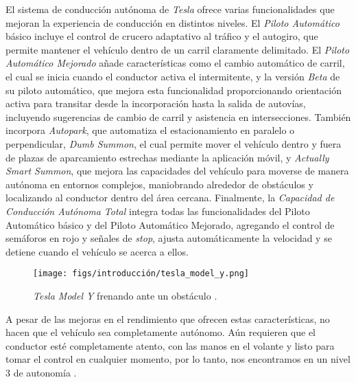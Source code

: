 El sistema de conducción autónoma de \textit{Tesla} ofrece varias funcionalidades que mejoran la experiencia de conducción en distintos niveles. El \textit{Piloto Automático} básico incluye el control de crucero adaptativo al tráfico y el autogiro, que permite mantener el vehículo dentro de un carril claramente delimitado. El \textit{Piloto Automático Mejorado} añade características como el cambio automático de carril, el cual se inicia cuando el conductor activa el intermitente, y la versión \textit{Beta} de su piloto automático, que mejora esta funcionalidad proporcionando orientación activa para transitar desde la incorporación hasta la salida de autovías, incluyendo sugerencias de cambio de carril y asistencia en intersecciones. También incorpora \textit{Autopark}, que automatiza el estacionamiento en paralelo o perpendicular, \textit{Dumb Summon}, el cual permite mover el vehículo dentro y fuera de plazas de aparcamiento estrechas mediante la aplicación móvil, y \textit{Actually Smart Summon}, que mejora las capacidades del vehículo para moverse de manera autónoma en entornos complejos, maniobrando alrededor de obstáculos y localizando al conductor dentro del área cercana. Finalmente, la \textit{Capacidad de Conducción Autónoma Total} integra todas las funcionalidades del Piloto Automático básico y del Piloto Automático Mejorado, agregando el control de semáforos en rojo y señales de \textit{stop}, ajusta automáticamente la velocidad y se detiene cuando el vehículo se acerca a ellos.

\begin{figure}[ht]
\begin{center}
\texttt{[image: figs/introducción/tesla\_model\_y.png]}
\end{center}
\caption{\textit{Tesla Model Y} frenando ante un obstáculo \cite{tesla-modely}.}
\label{tesla}
\end{figure}

A pesar de las mejoras en el rendimiento que ofrecen estas características, no hacen que el vehículo sea completamente autónomo. Aún requieren que el conductor esté completamente atento, con las manos en el volante y listo para tomar el control en cualquier momento, por lo tanto, nos encontramos en un nivel 3 de autonomía \cite{tesla-autopilot}.

